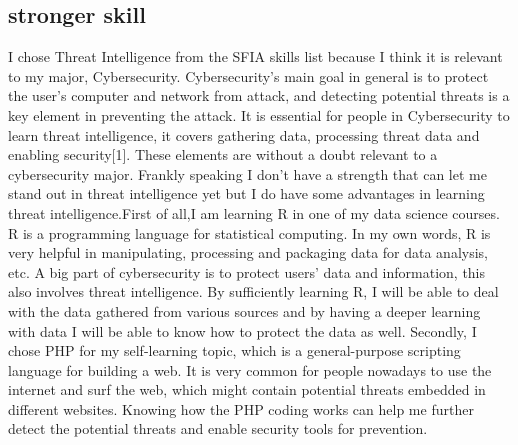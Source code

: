 \documentclass[a4paper, 11pt]{report}
\begin{document}
\subsection{stronger skill}
	I chose Threat Intelligence from the SFIA skills list because I think it is relevant to my major, Cybersecurity. Cybersecurity’s main goal in general is to protect the user's computer and network from attack, and detecting potential threats is a key element in preventing the attack. It is essential for people in Cybersecurity to learn threat intelligence, it covers gathering data, processing threat data and enabling security[1]. These elements are without a doubt relevant to a cybersecurity major. Frankly speaking I don’t have a strength that can let me stand out in threat intelligence yet but I do have some advantages in learning threat intelligence.First of all,I am learning R in one of my data science courses. R is a programming language for statistical computing. In my own words, R is very helpful in manipulating, processing and packaging data for data analysis, etc. A big part of cybersecurity is to protect users’ data and information, this also involves threat intelligence. By sufficiently learning R, I will be able to deal with the data gathered from various sources and by having a deeper learning with data I will be able to know how to protect the data as well. Secondly, I chose PHP for my self-learning topic, which is a general-purpose scripting language for building a web. It is very common for people nowadays to use the internet and surf the web, which might contain potential threats embedded in different websites. Knowing how the PHP coding works can help me further detect the potential threats and enable security tools for prevention.
\end{document}
